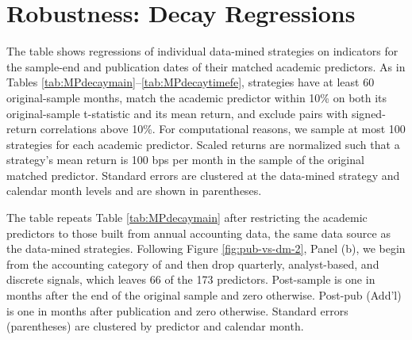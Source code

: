 
\section{Robustness: Decay Regressions}\label{sec:robust}

\begin{table}[H]
    \caption{Individual data-mined returns post-sample and post-publication}\label{tab:MPdecayIndividualDM}
    \small

    The table shows regressions of individual data-mined strategies on indicators for the sample-end and publication dates of their matched academic predictors. As in Tables \ref{tab:MPdecaymain}--\ref{tab:MPdecaytimefe}, strategies have at least 60 original-sample months, match the academic predictor within 10\% on both its original-sample t-statistic and its mean return, and exclude pairs with signed-return correlations above 10\%. For computational reasons, we sample at most 100 strategies for each academic predictor.
    Scaled returns are normalized such that a strategy's mean return is 100 bps per month in the sample of the original matched predictor. Standard errors are clustered at the data-mined strategy and calendar month levels and are shown in parentheses.
    \vspace{2ex}

    \centering

    \setlength{\tabcolsep}{2.0ex}
    
\end{table}


\begin{table}[H]
    \caption{Decay regressions using only annual accounting predictors}\label{tab:MPdecayacctonly}
    \small

    The table repeats Table \ref{tab:MPdecaymain} after restricting the academic predictors to those built from annual accounting data, the same data source as the data-mined strategies. Following Figure \ref{fig:pub-vs-dm-2}, Panel (b), we begin from the accounting category of \citet{ChenZimmermann2021} and then drop quarterly, analyst-based, and discrete signals, which leaves 66 of the 173 predictors. Post-sample is one in months after the end of the original sample and zero otherwise. Post-pub (Add'l) is one in months after publication and zero otherwise. Standard errors (parentheses) are clustered by predictor and calendar month.
    \vspace{2ex}

    \centering

    \setlength{\tabcolsep}{2.0ex}
    
\end{table}

